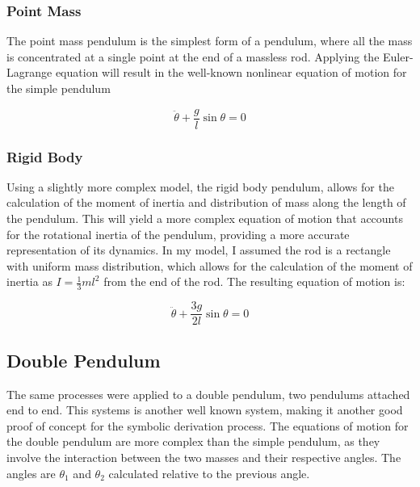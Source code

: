 \documentclass[onecolumn,draftcls]{IEEEtran}
\begin{document}
\subsubsection*{Point Mass}
The point mass pendulum is the simplest form of a pendulum, where all the mass is concentrated at a single point at the end of a massless rod. Applying the Euler-Lagrange equation will result in the well-known nonlinear equation of motion for the simple pendulum

\begin{equation}
    \label{eq:pendulum_point_mass}
    \ddot{\theta} + \frac{g}{l} \sin\theta = 0
\end{equation}

\subsubsection*{Rigid Body}
Using a slightly more complex model, the rigid body pendulum, allows for the calculation of the moment of inertia and distribution of mass along the length of the pendulum. This will yield a more complex equation of motion that accounts for the rotational inertia of the pendulum, providing a more accurate representation of its dynamics. In my model, I assumed the rod is a rectangle with uniform mass distribution, which allows for the calculation of the moment of inertia as $I = \frac{1}{3}ml^2$ from the end of the rod. The resulting equation of motion is:

\begin{equation}
    \label{eq:pendulum_rigid_body}
    \ddot{\theta} + \frac{3g}{2l} \sin\theta = 0
\end{equation}

\subsection*{Double Pendulum}
The same processes were applied to a double pendulum, two pendulums attached end to end. This systems is another well known system, making it another good proof of concept for the symbolic derivation process. The equations of motion for the double pendulum are more complex than the simple pendulum, as they involve the interaction between the two masses and their respective angles. The angles are $\theta_1$ and $\theta_2$ calculated relative to the previous angle.
\end{document}

